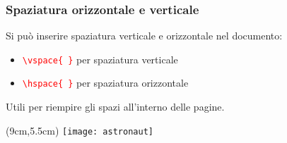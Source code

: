 \begin{frame}
  \frametitle{Spaziatura orizzontale e verticale}
  
  Si può inserire spaziatura verticale e orizzontale nel documento:
  \begin{itemize}
   \item \textcolor{red}{\texttt{\textbackslash vspace\{ \}}} per spaziatura 
verticale
   \item \textcolor{red}{\texttt{\textbackslash hspace\{ \}}} per spaziatura 
orizzontale
  \end{itemize}
  
  Utili per riempire gli spazi all'interno delle pagine.
  
  
  \begin{textblock*}{5cm}(9cm,5.5cm)
   \texttt{[image: astronaut]}
 \end{textblock*}
 

\end{frame}
